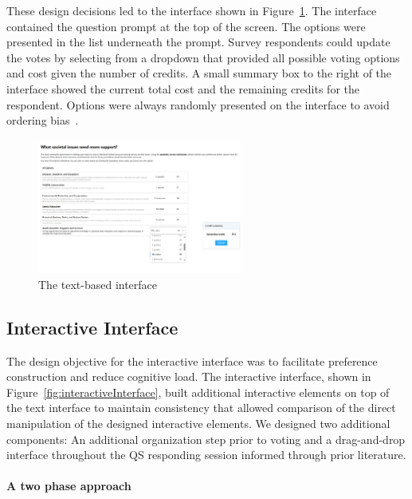 These design decisions led to the interface shown in Figure~\ref{fig:textInterface}. The interface contained the question prompt at the top of the screen. The options were presented in the list underneath the prompt. Survey respondents could update the votes by selecting from a dropdown that provided all possible voting options and cost given the number of credits. A small summary box to the right of the interface showed the current total cost and the remaining credits for the respondent. Options were always randomly presented on the interface to avoid ordering bias~\cite{ferberOrderBiasMail1952, couperWebSurveyDesign2001}.

\begin{figure}[H]
    \centering
    \includegraphics[width=0.6\textwidth]{content/image/text_interface.png}
    \caption{The text-based interface}
    \label{fig:textInterface}
\end{figure}

\subsection{Interactive Interface}
The design objective for the interactive interface was to facilitate preference construction and reduce cognitive load. The interactive interface, shown in Figure~\ref{fig:interactiveInterface}, built additional interactive elements on top of the text interface to maintain consistency that allowed comparison of the direct manipulation of the designed interactive elements. We designed two additional components: An additional organization step prior to voting and a drag-and-drop interface throughout the QS responding session informed through prior literature.

\paragraph{A two phase approach}

